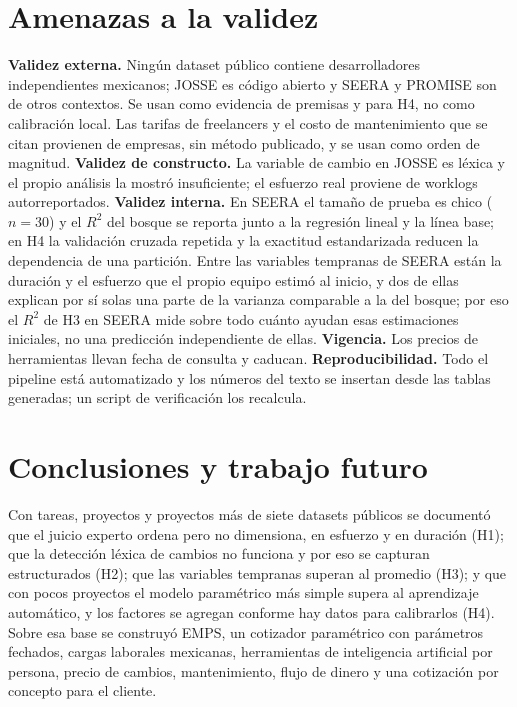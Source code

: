 \documentclass[10pt,twocolumn]{article}
\begin{document}
\section{Amenazas a la validez}
\textbf{Validez externa.} Ningún dataset público contiene desarrolladores independientes mexicanos; JOSSE es código abierto y SEERA y PROMISE son de otros contextos. Se usan como evidencia de premisas y para H4, no como calibración local. Las tarifas de freelancers y el costo de mantenimiento que se citan provienen de empresas, sin método publicado, y se usan como orden de magnitud. \textbf{Validez de constructo.} La variable de cambio en JOSSE es léxica y el propio análisis la mostró insuficiente; el esfuerzo real proviene de worklogs autorreportados. \textbf{Validez interna.} En SEERA el tamaño de prueba es chico ($n=30$) y el $R^2$ del bosque se reporta junto a la regresión lineal y la línea base; en H4 la validación cruzada repetida y la exactitud estandarizada reducen la dependencia de una partición. Entre las variables tempranas de SEERA están la duración y el esfuerzo que el propio equipo estimó al inicio, y dos de ellas explican por sí solas una parte de la varianza comparable a la del bosque; por eso el $R^2$ de H3 en SEERA mide sobre todo cuánto ayudan esas estimaciones iniciales, no una predicción independiente de ellas. \textbf{Vigencia.} Los precios de herramientas llevan fecha de consulta y caducan. \textbf{Reproducibilidad.} Todo el pipeline está automatizado y los números del texto se insertan desde las tablas generadas; un script de verificación los recalcula.

\section{Conclusiones y trabajo futuro}
Con \nJosse{} tareas, \nSeera{} proyectos y \nuevoNproyectosPublicos{} proyectos más de siete datasets públicos se documentó que el juicio experto ordena pero no dimensiona, en esfuerzo y en duración (H1); que la detección léxica de cambios no funciona y por eso se capturan estructurados (H2); que las variables tempranas superan al promedio (H3); y que con pocos proyectos el modelo paramétrico más simple supera al aprendizaje automático, y los factores se agregan conforme hay datos para calibrarlos (H4). Sobre esa base se construyó EMPS, un cotizador paramétrico con parámetros fechados, cargas laborales mexicanas, herramientas de inteligencia artificial por persona, precio de cambios, mantenimiento, flujo de dinero y una cotización por concepto para el cliente.
\end{document}
